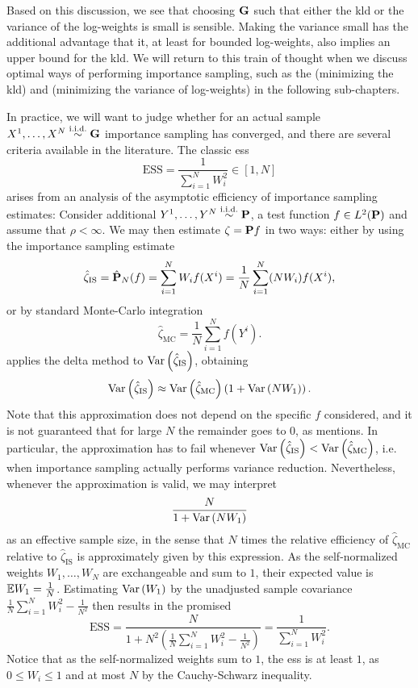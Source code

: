 Based on this discussion, we see that choosing $\G$ such that either the \gls{kld} or the variance of the log-weights is small is sensible. Making the variance small has the additional advantage that it, at least for bounded log-weights, also implies an upper bound for the \gls{kld}. We will return to this train of thought when we discuss optimal ways of performing importance sampling, such as the \acem (minimizing the \gls{kld}) and \aeis (minimizing the variance of log-weights) in the following sub-chapters.

In practice, we will want to judge whether for an actual sample $X^{1}, \dots, X^{N} \iid \G$ importance sampling has converged, and there are several criteria available in the literature. The classic \gls{ess}\citep{Kong1994Sequential} 
$$
\text{ESS} = \frac{1}{\sum_{i = 1}^N W^{2}_{i}} \in \left[1, N\right]
$$
arises from an analysis of the asymptotic efficiency of importance sampling estimates: Consider additional $Y^{1}, \dots, Y^{N}\iid \P$, a test function $f \in L^{2} (\P)$ and assume that $\rho < \infty$. We may then estimate $\zeta = \P f$ in two ways: either by using the importance sampling estimate 
$$
\hat \zeta_{\text{IS}} = \hat \P_{N} (f) = \sum_{i = 1}^N W_{i} f(X^{i}) = \frac{1}{N} \sum_{i = 1}^N (NW_{i}) f(X^{i}),
$$
or by standard Monte-Carlo integration 
$$
\hat \zeta_{\text{MC}} = \frac{1}{N}\sum_{i = 1}^N f(Y^{i}).
$$
\citep{Kong1992Note} applies the delta method to $\var \left( \hat\zeta_{\text{IS}} \right)$, obtaining
\begin{align*}
    \var \left( \hat\zeta_{\text{IS}}  \right) \approx \var \left( \hat \zeta_{\text{MC}} \right)\left( 1 + \var \left( NW_{1}\right) \right).
\end{align*}
Note that this approximation does not depend on the specific $f$ considered, and it is not guaranteed that for large $N$ the remainder goes to $0$, as \citep{Kong1992Note} mentions. In particular, the approximation has to fail whenever $\var \left( \hat\zeta_{\text{IS}} \right) < \var \left( \hat \zeta_{\text{MC}} \right)$, i.e. when importance sampling actually performs variance reduction. Nevertheless, whenever the approximation is valid, we may interpret 
$$
\frac{N}{1 + \var \left( NW_{1} \right)}
$$
as an effective sample size, in the sense that $N$ times the relative efficiency of $\hat\zeta_{\text{MC}}$ relative to $\hat \zeta_{\text{IS}}$ is approximately given by this expression. As the self-normalized weights $W_{1}, \dots, W_{N}$ are exchangeable and sum to $1$, their expected value is $ \E W_{1} = \frac{1}N$. Estimating $\var \left( W_{1} \right)$ by the unadjusted sample covariance $\frac{1}{N} \sum_{i=1}^N W_{i}^2 - \frac{1}{N^{2}}$ then results in the promised
$$
\text{ESS} = \frac{N}{1 + N^{2}\left(\frac{1}{N} \sum_{i = 1}^N W_{i}^2 - \frac{1}{N^{2}}\right)} = \frac{1}{\sum_{i = 1}^{N} W_{i}^{2}}.
$$
Notice that as the self-normalized weights sum to $1$, the \gls{ess} is at least $1$, as $0 \leq W_{i} \leq 1$ and at most $N$ by the Cauchy-Schwarz inequality. 

